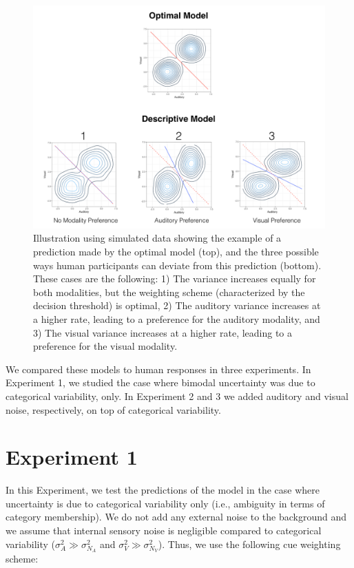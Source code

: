 \documentclass[english,floatsintext,man]{apa6}
\theoremstyle{definition}
\theoremstyle{definition}
\theoremstyle{definition}
\theoremstyle{remark}
\begin{document}
\begin{figure}[!h]
\includegraphics[width=\textwidth]{pictures/sub-optimal} \caption{Illustration using simulated data showing the example of a prediction made by the optimal model (top), and the three possible ways human participants can deviate from this prediction (bottom). These cases are the following: 1) The variance increases equally for both modalities, but the weighting scheme (characterized by the decision threshold) is optimal, 2) The auditory variance increases at a higher rate, leading to a preference for the auditory modality, and 3) The visual variance increases at a higher rate, leading to a preference for the visual modality.}\label{fig:subOptim}
\end{figure}

We compared these models to human responses in three experiments. In
Experiment 1, we studied the case where bimodal uncertainty was due to
categorical variability, only. In Experiment 2 and 3 we added auditory
and visual noise, respectively, on top of categorical variability.

\section{Experiment 1}\label{experiment-1}

In this Experiment, we test the predictions of the model in the case
where uncertainty is due to categorical variability only (i.e.,
ambiguity in terms of category membership). We do not add any external
noise to the background and we assume that internal sensory noise is
negligible compared to categorical variability
(\(\sigma^2_{A} \gg \sigma^2_{N_A}\) and
\(\sigma^2_{V} \gg \sigma^2_{N_V}\)). Thus, we use the following cue
weighting scheme:
\end{document}
